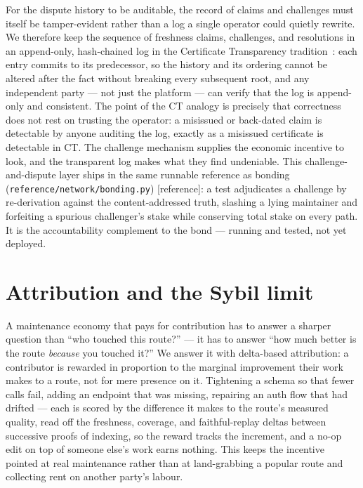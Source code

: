 \documentclass[11pt]{article}
\newcommand{\refimpl}{\textcolor{blue!70!black}{\small[reference]}}
\begin{document}
For the dispute history to be auditable, the record of claims and challenges must
itself be tamper-evident rather than a log a single operator could quietly rewrite.
We therefore keep the sequence of freshness claims, challenges, and resolutions in
an append-only, hash-chained log in the Certificate Transparency
tradition~\cite{rfc6962}: each entry commits to its predecessor, so the history and
its ordering cannot be altered after the fact without breaking every subsequent
root, and any independent party --- not just the platform --- can verify that the
log is append-only and consistent. The point of the CT analogy is precisely that
correctness does not rest on trusting the operator: a misissued or back-dated claim
is detectable by anyone auditing the log, exactly as a misissued certificate is
detectable in CT. The challenge mechanism supplies the economic incentive to look,
and the transparent log makes what they find undeniable. This challenge-and-dispute
layer ships in the same runnable reference as bonding
(\texttt{reference/network/bonding.py}) \refimpl{}: a test adjudicates a challenge by
re-derivation against the content-addressed truth, slashing a lying maintainer and
forfeiting a spurious challenger's stake while conserving total stake on every path.
It is the accountability complement to the bond --- running and tested, not yet
deployed.

\section{Attribution and the Sybil limit}

A maintenance economy that pays for contribution has to answer a sharper question
than ``who touched this route?'' --- it has to answer ``how much better is the
route \emph{because} you touched it?'' We answer it with delta-based attribution:
a contributor is rewarded in proportion to the marginal improvement their work
makes to a route, not for mere presence on it. Tightening a schema so that fewer
calls fail, adding an endpoint that was missing, repairing an auth flow that had
drifted --- each is scored by the difference it makes to the route's measured
quality, read off the freshness, coverage, and faithful-replay deltas between
successive proofs of indexing, so the reward tracks the increment, and a no-op edit
on top of someone else's work earns nothing. This keeps the incentive pointed at
real maintenance rather than at land-grabbing a popular route and collecting rent
on another party's labour.
\end{document}
